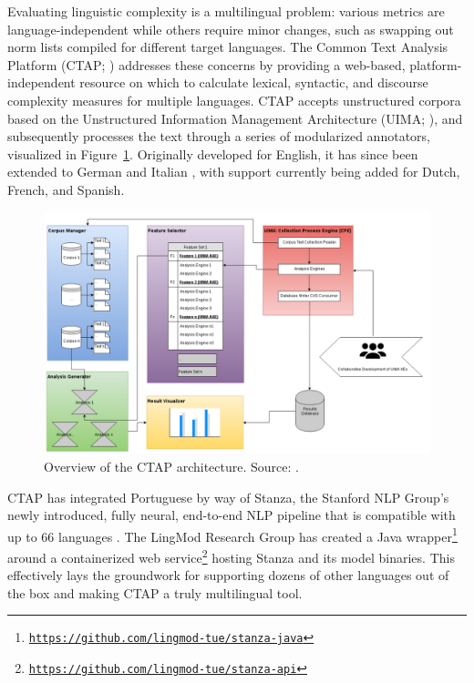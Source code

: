 Evaluating linguistic complexity is a multilingual problem: various metrics are language-independent while others require minor changes, such as swapping out norm lists compiled for different target languages. The Common Text Analysis Platform (CTAP; \citealp{chen2016-ctap}) addresses these concerns by providing a web-based, platform-independent resource on which to calculate \mbox{lexical,} syntactic, and discourse complexity measures for multiple languages. CTAP accepts unstructured corpora based on the Unstructured Information Management Architecture (UIMA; \citealp{uima2004}), and subsequently processes the text through a series of modularized annotators, visualized in Figure~\ref{fig:ctap}. Originally developed for English, it has since been extended to German \citep{weiss2019-german} and Italian \citep{okinina2020-ctap}, with support currently being added for Dutch, French, and Spanish.

\begin{figure}[b!]
    \centering
    \includegraphics[scale=0.3]{images/ctap.png}
    \caption{Overview of the CTAP architecture. Source: \cite{chen2016-ctap}.}
    \label{fig:ctap}
\end{figure}

CTAP has integrated Portuguese by way of Stanza, the Stanford NLP Group's newly introduced, fully neural, end-to-end NLP pipeline that is compatible with up to 66 languages \citep{qi2020-stanza}. The LingMod Research Group has created a Java wrapper\footnote{\texttt{\url{https://github.com/lingmod-tue/stanza-java}}} around a containerized web service\footnote{\texttt{\url{https://github.com/lingmod-tue/stanza-api}}} hosting Stanza and its model binaries. This effectively lays the groundwork for supporting dozens of other languages out of the box and making CTAP a truly multilingual tool.
